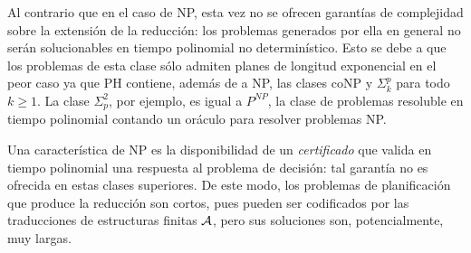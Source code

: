 Al contrario que en el caso de NP,
esta vez no se ofrecen garantías de complejidad sobre la extensión de la
reducción: los problemas \STRIPS generados por ella en general no serán
solucionables en tiempo polinomial no determinístico.
Esto se debe a que los problemas de esta clase sólo admiten planes
de longitud exponencial en el peor caso ya que PH contiene, además de a NP, las
clases coNP y $\Sigma^p_k$ para todo $k\geq 1$. La clase $\Sigma_p^2$, por
ejemplo, es igual a $P^{NP}$, la clase de problemas resoluble en tiempo
polinomial contando un oráculo para resolver problemas NP.

Una característica de NP es la 
disponibilidad de un \textit{certificado} que valida en tiempo polinomial una
respuesta al problema de decisión: tal garantía no es ofrecida en estas clases
superiores.
De este modo, los problemas de planificación que produce la reducción son
cortos, pues pueden ser codificados por las traducciones de estructuras finitas
$\mathcal{A}$, pero sus soluciones son, potencialmente, muy largas.


%

